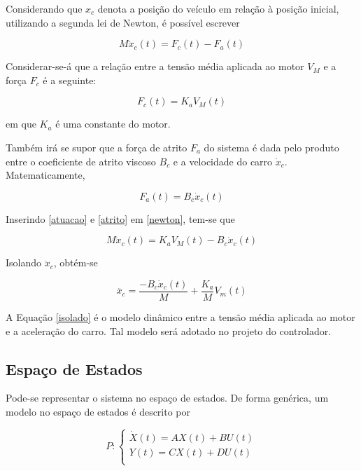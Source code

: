 Considerando que $x_c$ denota a posição do veículo em relação à posição inicial, utilizando a segunda lei de Newton, é possível escrever

\begin{equation}
    M\ddot{x}_c(t)=F_c(t)-F_a(t)
    \label{newton}
\end{equation}

Considerar-se-á que a relação entre a tensão média aplicada ao motor $V_M$ e a força $F_c$ é a seguinte:

\begin{equation}
    F_c(t)=K_aV_M(t)
    \label{atuacao}
\end{equation}

\noindent em que $K_a$ é uma constante do motor.

Também irá se supor que a força de atrito $F_a$ do sistema é dada pelo produto entre o coeficiente de atrito viscoso $B_c$ e a velocidade do carro $\dot{x}_c$. Matematicamente, 

\begin{equation}
    F_a(t)=B_c\dot{x}_c(t)
    \label{atrito}
\end{equation}

Inserindo \eqref{atuacao} e \eqref{atrito} em \eqref{newton}, tem-se que

\begin{equation}
    M\ddot{x}_c(t)=K_aV_M(t)-B_c\dot{x}_c(t)
    \label{newton2}
\end{equation}

Isolando $\ddot{x}_c$, obtém-se

\begin{equation}
    \ddot{x_c}=\frac{-B_c\dot{x}_c(t)}{M}+\frac{K_a}{M}V_m(t)
    \label{isolado}
\end{equation}

A Equação \eqref{isolado} é o modelo dinâmico entre a tensão média aplicada ao motor e a aceleração do carro. Tal modelo será adotado no projeto do controlador.

\subsection{Espaço de Estados}
Pode-se representar o sistema no espaço de estados. De forma genérica, um modelo no espaço de estados é descrito por

\begin{equation}
    P :\begin{cases} 
        \dot{X}(t) = AX(t) + BU(t) \\
        Y(t) = CX(t) + DU(t) \\
        \end{cases}
    \label{modelo_espaco_estados}
\end{equation}

